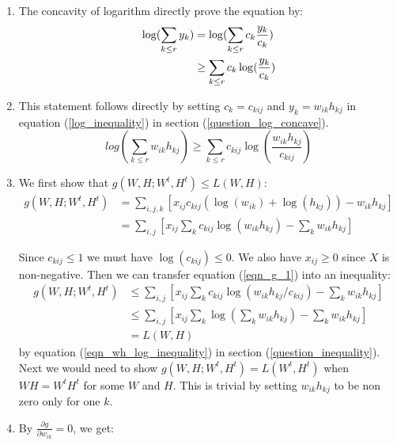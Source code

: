 \documentclass{article}
\begin{document}
\begin{enumerate}
\begin{enumerate}
\item \label{question_log_concave}
The concavity of logarithm directly prove the equation by:
\begin{align}
\log ( \sum_{k \leq r} y_{k} ) &= \log ( \sum_{k \leq r} c_{k} \frac{y_{k}}{c_{k}}) \notag \\
& \geq \sum_{k \leq r} c_{k} \log (\frac{y_{k}}{c_{k}}) \label{log_inequality}
\end{align}
\pagebreak

\item \label{question_inequality}
This statement follows directly by setting $c_{k}=c_{kij}$ and $y_k = w_{ik} h_{kj}$ in equation (\ref{log_inequality}) in section (\ref{question_log_concave}).
\begin{equation}
log (\sum_{k \leq r} w_{ik}h_{kj}) \geq \sum_{k \leq r} c_{kij} \log(\frac{w_{ik}h_{kj}}{c_{kij}}) \label{eqn_wh_log_inequality}
\end{equation}

\pagebreak

\item 
We first show that $g(W, H; W^{t}, H^{t}) \leq L(W, H)$:
\begin{align}
g(W, H; W^{t}, H^{t}) &= \sum_{i, j, k} [x_{ij} c_{kij}(\log(w_{ik})+\log(h_{kj})) - w_{ik}h_{kj}] \\
&= \sum_{i,j} [x_{ij} \sum_{k} c_{kij}\log(w_{ik} h_{kj})- \sum_{k} w_{ik}h_{kj}] \label{eqn_g_1}
\end{align}

Since $c_{kij} \leq 1$ we must have $\log(c_{kij}) \leq 0$. We also have $x_{ij} \geq 0$  since $X$ is non-negative. Then we can transfer equation (\ref{eqn_g_1}) into an inequality:
\begin{align}
g(W, H; W^{t}, H^{t}) &\leq \sum_{i,j} [x_{ij} \sum_{k} c_{kij}\log(w_{ik} h_{kj}/c_{kij})- \sum_{k} w_{ik}h_{kj}] \label{ineq_g_1}\\
&\leq \sum_{i,j} [x_{ij} \sum_{k} \log(\sum_{k} w_{ik} h_{kj})- \sum_{k} w_{ik}h_{kj}] \\
&=L(W,H)
\end{align}
by equation (\ref{eqn_wh_log_inequality}) in section (\ref{question_inequality}). Next we would need to show $g(W, H; W^{t}, H^{t}) = L(W^t, H^t)$ when $WH=W^{t}H^{t}$ for some $W$ and $H$. This is trivial by setting $w_{ik} h_{kj}$ to be non zero only for one $k$. 
\pagebreak

\item 
By $\frac{\partial g}{\partial w_{ik}}=0$, we get:


\end{enumerate}
\end{enumerate}
\end{document}
